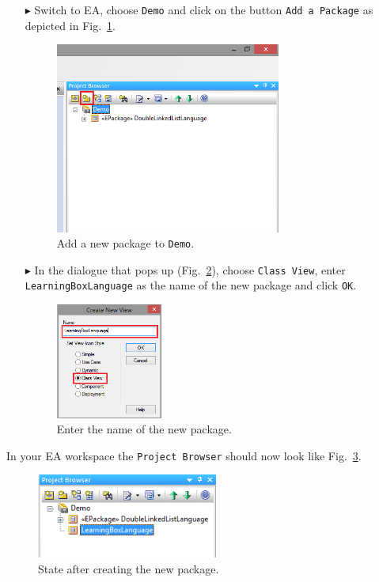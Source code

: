 \begin{enumerate}
\item[$\blacktriangleright$] Switch to EA, choose \texttt{Demo} and click on the button \texttt{Add a Package} as depicted in Fig.~\ref{fig:new_package}.

\begin{figure}[htbp]
	\centering
  \includegraphics[width=0.7\textwidth]{pics/memBoxBilder/memBox01.png}
	\caption{Add a new package to \texttt{Demo}.}
	\label{fig:new_package}
\end{figure}

\item[$\blacktriangleright$] In the dialogue that pops up (Fig.~\ref{fig:new_package_name}), choose \texttt{Class View}, enter \texttt{Learning\-Box\-Language} as the name of the new package and click \texttt{OK}.

\begin{figure}[htbp]
	\centering
    \includegraphics[width=0.33\textwidth]{pics/memBoxBilder/memBox02.png}
	\caption{Enter the name of the new package.}
	\label{fig:new_package_name}
\end{figure}
\end{enumerate}
\FloatBarrier

In your EA workspace the \texttt{Project Browser} should now look like Fig.~\ref{fig:new_package_completed}.
\begin{figure}[htbp]
	\centering
  \includegraphics[width=0.53\textwidth]{pics/memBoxBilder/memBox03.png}
	\caption{State after creating the new package.}
	\label{fig:new_package_completed}
\end{figure}
\FloatBarrier

